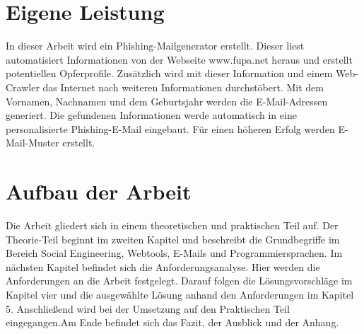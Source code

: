 \section{Eigene Leistung}
\label {sec:Leistung} 
In dieser Arbeit wird ein Phishing-Mailgenerator erstellt. Dieser liest automatisiert Informationen von der Webseite www.fupa.net heraus und erstellt potentiellen Opferprofile. Zusätzlich wird mit dieser Information und einem Web-Crawler das Internet nach weiteren Informationen durchstöbert. Mit dem Vornamen, Nachnamen und dem Geburtsjahr werden die E-Mail-Adressen generiert. Die gefundenen Informationen werde automatisch in eine personalisierte Phishing-E-Mail eingebaut. Für einen höheren Erfolg werden E-Mail-Muster erstellt.

\section{Aufbau der Arbeit}
\label {sec:Aufbau} 
Die Arbeit gliedert sich in einem theoretischen und praktischen Teil auf. Der Theorie-Teil beginnt im zweiten Kapitel und beschreibt die Grundbegriffe im Bereich Social Engineering, Webtools, E-Mails und Programmiersprachen. Im nächsten Kapitel befindet sich die Anforderungsanalyse. Hier werden die Anforderungen an die Arbeit festgelegt. Darauf folgen die Lösungsvorschläge im Kapitel vier und die ausgewählte Lösung anhand den Anforderungen im Kapitel 5. Anschließend wird bei der Umsetzung auf den Praktischen Teil eingegangen.Am Ende befindet sich das Fazit, der Ausblick und der Anhang.






